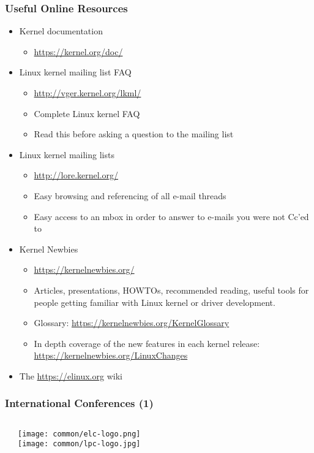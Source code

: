 \begin{frame}
  \frametitle{Useful Online Resources}
  \begin{itemize}
  \item Kernel documentation
    \begin{itemize}
    \item \url{https://kernel.org/doc/}
    \end{itemize}
  \item Linux kernel mailing list FAQ
    \begin{itemize}
    \item \url{http://vger.kernel.org/lkml/}
    \item Complete Linux kernel FAQ
    \item Read this before asking a question to the mailing list
    \end{itemize}
  \item Linux kernel mailing lists
    \begin{itemize}
    \item \url{http://lore.kernel.org/}
    \item Easy browsing and referencing of all e-mail threads
    \item Easy access to an mbox in order to answer to e-mails you were
      not Cc'ed to
    \end{itemize}
  \item Kernel Newbies
    \begin{itemize}
    \item \url{https://kernelnewbies.org/}
    \item Articles, presentations, HOWTOs, recommended reading, useful
      tools for people getting familiar with Linux kernel or driver
      development.
    \item Glossary: \url{https://kernelnewbies.org/KernelGlossary}
    \item In depth coverage of the new features in each kernel release: \url{https://kernelnewbies.org/LinuxChanges}
    \end{itemize}
  \item The \url{https://elinux.org} wiki
\end{itemize}
\end{frame}

\begin{frame}
  \frametitle{International Conferences (1)}
  \begin{columns}
  \begin{itemize}
    
    
  \end{itemize}
     \texttt{[image: common/elc-logo.png]}\\
     \vspace{1cm}
     \texttt{[image: common/lpc-logo.jpg]}\\
  \end{columns}
\end{frame}

